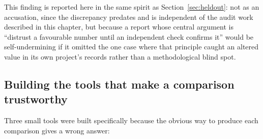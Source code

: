 This finding is reported here in the same spirit as
Section~\ref{sec:heldout}: not as an accusation, since the discrepancy
predates and is independent of the audit work described in this chapter,
but because a report whose central argument is ``distrust a favourable
number until an independent check confirms it'' would be self-undermining
if it omitted the one case where that principle caught an altered value in
its own project's records rather than a methodological blind spot.

\subsection{Building the tools that make a comparison trustworthy}

Three small tools were built specifically because the obvious way to
produce each comparison gives a wrong answer:


